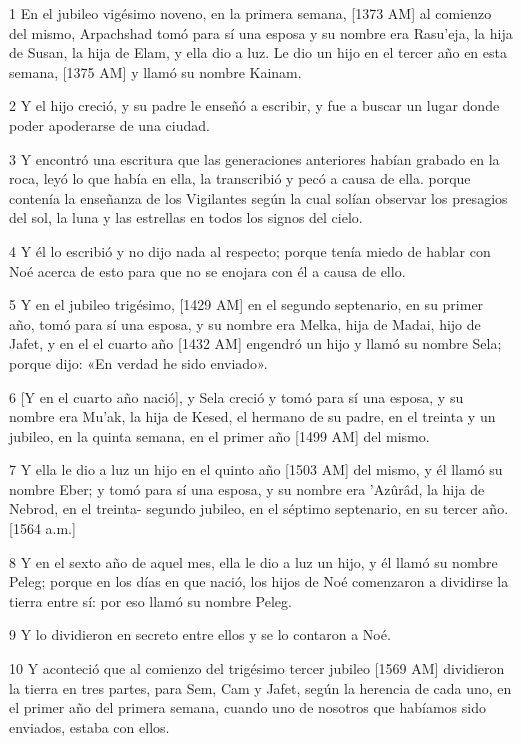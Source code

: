 \par 1 En el jubileo vigésimo noveno, en la primera semana, [1373 AM] al comienzo del mismo, Arpachshad tomó para sí una esposa y su nombre era Rasu'eja, la hija de Susan, la hija de Elam, y ella dio a luz. Le dio un hijo en el tercer año en esta semana, [1375 AM] y llamó su nombre Kainam.
\par 2 Y el hijo creció, y su padre le enseñó a escribir, y fue a buscar un lugar donde poder apoderarse de una ciudad.
\par 3 Y encontró una escritura que las generaciones anteriores habían grabado en la roca, leyó lo que había en ella, la transcribió y pecó a causa de ella. porque contenía la enseñanza de los Vigilantes según la cual solían observar los presagios del sol, la luna y las estrellas en todos los signos del cielo.
\par 4 Y él lo escribió y no dijo nada al respecto; porque tenía miedo de hablar con Noé acerca de esto para que no se enojara con él a causa de ello.
\par 5 Y en el jubileo trigésimo, [1429 AM] en el segundo septenario, en su primer año, tomó para sí una esposa, y su nombre era Melka, hija de Madai, hijo de Jafet, y en el el cuarto año [1432 AM] engendró un hijo y llamó su nombre Sela; porque dijo: «En verdad he sido enviado».
\par 6 [Y en el cuarto año nació], y Sela creció y tomó para sí una esposa, y su nombre era Mu'ak, la hija de Kesed, el hermano de su padre, en el treinta y un jubileo, en la quinta semana, en el primer año [1499 AM] del mismo.
\par 7 Y ella le dio a luz un hijo en el quinto año [1503 AM] del mismo, y él llamó su nombre Eber; y tomó para sí una esposa, y su nombre era 'Azûrâd, la hija de Nebrod, en el treinta- segundo jubileo, en el séptimo septenario, en su tercer año. [1564 a.m.]
\par 8 Y en el sexto año de aquel mes, ella le dio a luz un hijo, y él llamó su nombre Peleg; porque en los días en que nació, los hijos de Noé comenzaron a dividirse la tierra entre sí: por eso llamó su nombre Peleg.
\par 9 Y lo dividieron en secreto entre ellos y se lo contaron a Noé.
\par 10 Y aconteció que al comienzo del trigésimo tercer jubileo [1569 AM] dividieron la tierra en tres partes, para Sem, Cam y Jafet, según la herencia de cada uno, en el primer año del primera semana, cuando uno de nosotros que habíamos sido enviados, estaba con ellos.
